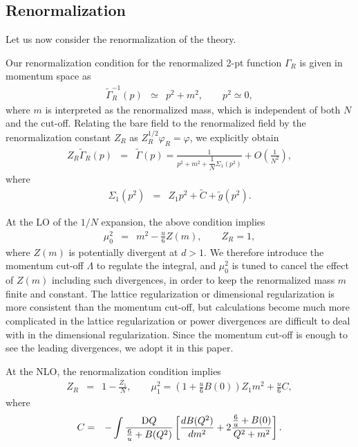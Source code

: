 \documentclass[preprint]{ptephy_v1}%
\newcommand{\rmD}{{\rm D}}
\begin{document}
\subsection{Renormalization}
 Let us now consider the renormalization of the theory.

Our renormalization condition for the renormalized 2-pt function $\Gamma_R$  is given in  momentum space as
\begin{eqnarray}
 \widetilde{\Gamma}_R^{-1}(p) &\simeq & p^2+ m^2, \qquad p^2\simeq 0,
\end{eqnarray}
where $m$ is interpreted as the renormalized mass, which is independent  of  both $N$ and the cut-off.
Relating the bare field to the renormalized field by the renormalization constant $Z_R$ as
$Z_R^{1/2} \varphi_R = \varphi$, we explicitly obtain 
\begin{eqnarray}
Z_R \widetilde{\Gamma}_R(p) &=& \widetilde{\Gamma}(p)  =  \frac{1}{p^2+m^2 +\dfrac{1}{N}\Sigma_1(p^2)} + O\left(\frac{1}{N^2}\right) ,
\end{eqnarray}
where
\begin{eqnarray}
\Sigma_1(p^2) &=& Z_1 p^2 + \tilde C +\tilde g(p^2) .
\end{eqnarray}

At the LO of the $1/N$ expansion, the above condition implies
\begin{eqnarray}
\mu_0^2 &=& m^2 -\frac{u}{6} Z(m) , \qquad Z_R = 1, 
\end{eqnarray}
where $Z(m)$ 
is potentially divergent at $d > 1$. We therefore introduce the momentum cut-off $\Lambda$ to regulate the integral, and 
$\mu^2_0$ is tuned to cancel
the effect of $Z(m)$ including such divergences, in order to  keep the renormalized mass $m$ finite and constant.
The lattice regularization or dimensional regularization is more consistent than the momentum cut-off, but calculations become much more complicated in the lattice regularization or power divergences are difficult to deal with  in the dimensional regularization. Since the momentum cut-off is enough to see the leading divergences, we adopt it in this paper. 

At the NLO, the renormalization condition implies 
\begin{eqnarray}
Z_R &=& 1 -\frac{Z_1}{N}, \qquad 
\mu_1^2 = \left(1+\frac{u}{6}B(0) \right) Z_1 m^2 + \frac{u}{6} C  ,
\label{eq:Z1_mu1}
\end{eqnarray}
where
\begin{eqnarray}
C
&=&
-\int \frac{\rmD Q}{\frac{6}{u}+B(Q^2)}\left[\frac{d B(Q^2)}{d m^2} +2\frac{\frac{6}{u} + B(0)}{Q^2+m^2}\right].
\label{eq:C}
\end{eqnarray}
\end{document}
